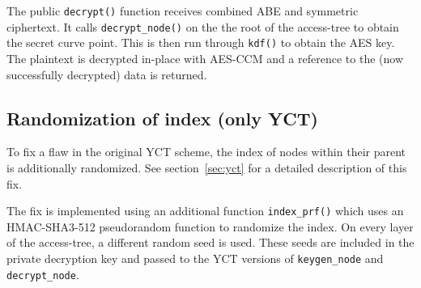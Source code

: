 The public \verb+decrypt()+ function receives combined ABE and symmetric ciphertext. 
It calls \verb.decrypt_node(). on the the root of the \gls{access-tree} to obtain the secret curve point.
This is then run through \verb+kdf()+ to obtain the AES key.
The plaintext is decrypted in-place with AES-CCM and a reference to the (now successfully decrypted) data is returned.

\subsection{Randomization of index (only YCT)}
To fix a flaw in the original YCT scheme, the index of nodes within their parent is additionally randomized.
See section~\ref{sec:yct} for a detailed description of this fix.

The fix is implemented using an additional function \verb+index_prf()+ which uses an HMAC-SHA3-512 pseudorandom function to randomize the index.
On every layer of the \gls{access-tree}, a different random seed is used. 
These seeds are included in the private decryption key and passed to the YCT versions of \verb+keygen_node+ and \verb+decrypt_node+.

